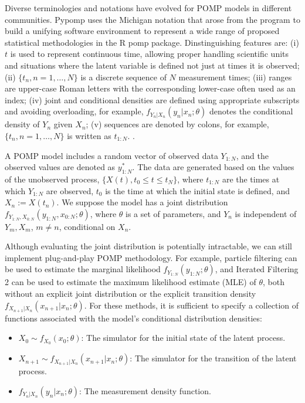 \documentclass[twoside,11pt]{article}
\begin{document}
Diverse terminologies and notations have evolved for POMP models in
different communities. Pypomp uses the Michigan notation that arose from
the program to build a unifying software environment to represent a wide
range of proposed statistical methodologies in the R pomp package.
Dinstinguishing features are: (i) \(t\) is used to represent continuous
time, allowing proper handling scientific units and situations where the
latent variable is defined not just at times it is observed; (ii)
\(\{t_n, n=1,\dots,N\}\) is a discrete sequence of \(N\) measurement
times; (iii) ranges are upper-case Roman letters with the corresponding
lower-case often used as an index; (iv) joint and conditional densities
are defined using appropriate subscripts and avoiding overloading, for
example, \(f_{Y_n|X_n}(y_n|x_n;\theta)\) denotes the conditional density
of \(Y_n\) given \(X_n\); (v) sequences are denoted by colons, for
example, \(\{t_n, n=1,\dots,N\}\) is written as \(t_{1:N}\).
.

A POMP model includes a random vector of observed data \(Y_{1:N}\), and
the observed values are denoted as \(y^*_{1:N}\). The data are generated
based on the values of the unobserved process,
\(\{X(t), t_0 \leq t \leq t_{N}\}\), where \(t_{1:N}\) are the times at
which \(Y_{1:N}\) are observed, \(t_0\) is the time at which the initial
state is defined, and \(X_n := X(t_n)\). We suppose the model has a
joint distribution \(f_{Y_{1:N},X_{0:N}}(y_{1:N},x_{0:N}; \theta)\),
where \(\theta\) is a set of parameters, and \(Y_n\) is independent of
\(Y_m, X_m\), \(m \neq n\), conditional on \(X_n\).

Although evaluating the joint distribution is potentially intractable,
we can still implement plug-and-play POMP methodology. For example,
particle filtering \citep{arulampalam2002} can be used to estimate the
marginal likelihood \(f_{Y_{1:N}}(y_{1:N}; \theta)\), and Iterated
Filtering 2 \citep{ionides2015} can be used to estimate the maximum
likelihood estimate (MLE) of \(\theta\), both without an explicit joint
distribution or the explicit transition density
\(f_{X_{n+1}|X_{n}}(x_{n+1} | x_{n} ; \theta)\). For these methods, it
is sufficient to specify a collection of functions associated with the
model's conditional distribution densities:

\begin{itemize}
    \item $X_0 \sim f_{X_0}(x_0 ; \theta)$: The simulator for the initial state of the latent process.
    \item $X_{n+1} \sim f_{X_{n+1}|X_{n}}(x_{n+1} | x_{n} ; \theta)$: The simulator for the transition of the latent process.
    \item $f_{Y_n|X_n}(y_n| x_n; \theta)$: The measurement density function.
\end{itemize}
\end{document}
